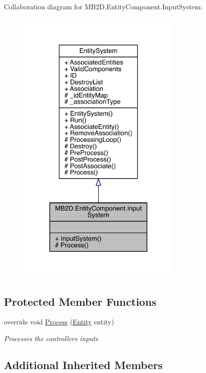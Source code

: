 Collaboration diagram for M\+B2\+D.\+Entity\+Component.\+Input\+System\+:\nopagebreak
\begin{figure}[H]
\begin{center}
\leavevmode
\includegraphics[width=228pt]{class_m_b2_d_1_1_entity_component_1_1_input_system__coll__graph}
\end{center}
\end{figure}
\subsection*{Protected Member Functions}
\begin{DoxyCompactItemize}
\item 
override void \hyperlink{class_m_b2_d_1_1_entity_component_1_1_input_system_afa241f5c32788fc65587e0443f7217b3}{Process} (\hyperlink{class_m_b2_d_1_1_entity_component_1_1_entity}{Entity} entity)
\begin{DoxyCompactList}\small\item\em Processes the controllers inputs \end{DoxyCompactList}\end{DoxyCompactItemize}
\subsection*{Additional Inherited Members}


